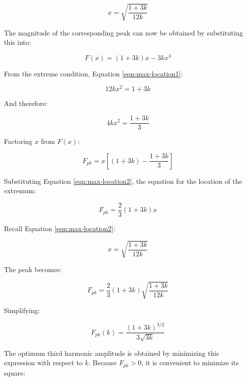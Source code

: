 \begin{equation}
\label{eqn:max-location2}
    x = \sqrt{\frac{1 + 3k}{12k}}
\end{equation}

The magnitude of the corresponding peak can now be obtained by substituting this into:

\begin{equation}
    F(x) = (1 + 3k)x - 3kx^3
\end{equation}

From the extreme condition, Equation \ref{eqn:max-location1}:

\begin{equation}
    12kx^2 = 1 + 3k
\end{equation}

And therefore:

\begin{equation}
    4kx^2 = \frac{1 + 3k}{3}
\end{equation}

Factoring $x$ from $F(x)$:

\begin{equation}
    F_{pk} = x\left[(1 + 3k) - \frac{1 + 3k}{3}\right]
\end{equation}

Substituting Equation \ref{eqn:max-location2}, the equation for the location of the extremum:

\begin{equation}
    F_{pk} = \frac{2}{3}(1 + 3k)x
\end{equation}

Recall Equation \ref{eqn:max-location2}:

\begin{equation}
    x = \sqrt{\frac{1 + 3k}{12k}}
\end{equation}

The peak becomes:

\begin{equation}
    F_{pk} = \frac{2}{3}(1 + 3k)\sqrt{\frac{1 + 3k}{12k}}
\end{equation}

Simplifying:

\begin{equation}
    F_{pk}(k) = \frac{(1 + 3k)^{3/2}}{3\sqrt{3k}}
\end{equation}

The optimum third harmonic amplitude is obtained by minimizing this expression with respect to $k$. Because $F_{pk} > 0$, it is convenient to minimize its square:

